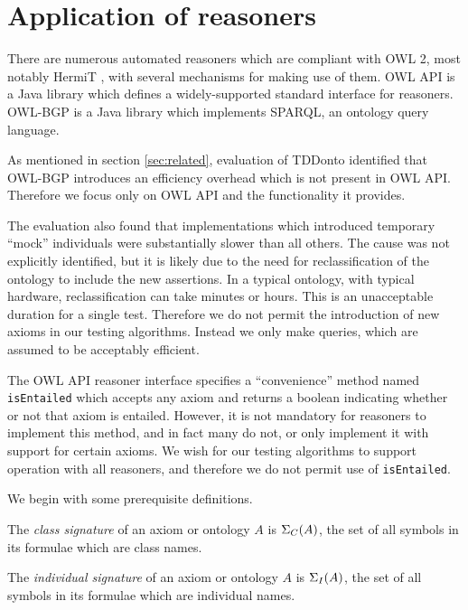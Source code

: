 \documentclass[paper.tex]{subfiles}
\begin{document}
\section{Application of reasoners}
\label{sec:reasoners}

There are numerous automated reasoners which are compliant with OWL 2, most notably HermiT \cite{Glimm:HermiT}, with several mechanisms for making use of them.  OWL API \cite{OWLAPI} is a Java library which defines a widely-supported standard interface for reasoners.  OWL-BGP \cite{OWLBGP} is a Java library which implements SPARQL, an ontology query language.

As mentioned in section \ref{sec:related}, evaluation of TDDonto identified that OWL-BGP introduces an efficiency overhead which is not present in OWL API.  Therefore we focus only on OWL API and the functionality it provides.

The evaluation also found that implementations which introduced temporary ``mock'' individuals were substantially slower than all others.  The cause was not explicitly identified, but it is likely due to the need for reclassification of the ontology to include the new assertions.  In a typical ontology, with typical hardware, reclassification can take minutes or hours.  This is an unacceptable duration for a single test.  Therefore we do not permit the introduction of new axioms in our testing algorithms.  Instead we only make queries, which are assumed to be acceptably efficient.

The OWL API reasoner interface specifies a ``convenience'' method named \texttt{isEntailed} which accepts any axiom and returns a boolean indicating whether or not that axiom is entailed.  However, it is not mandatory for reasoners to implement this method, and in fact many do not, or only implement it with support for certain axioms.  We wish for our testing algorithms to support operation with all reasoners, and therefore we do not permit use of \texttt{isEntailed}.

We begin with some prerequisite definitions.

\begin{definition}
  The \emph{class signature} of an axiom or ontology $A$ is $\Sigma_C(A)$, the set of all symbols in its formulae which are class names.
\end{definition}

\begin{definition}
  The \emph{individual signature} of an axiom or ontology $A$ is $\Sigma_I(A)$, the set of all symbols in its formulae which are individual names.
\end{definition}
\end{document}
